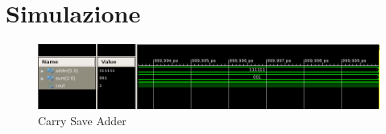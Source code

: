 %

\section{Simulazione}

\begin{figure}[H]
	\centering
\includegraphics[scale=0.55]{esercizio10/images/carry_save_adder_testbench.png}
	\caption{Carry Save Adder}
\end{figure}%

